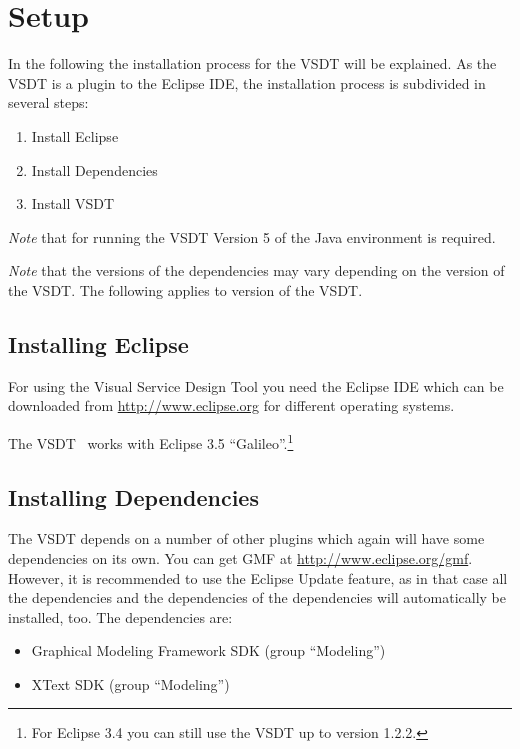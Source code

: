 \chapter{Setup}
\label{sec:user_setup}

In the following the installation process for the VSDT will be explained. As the VSDT is a plugin to the Eclipse IDE, the installation process is subdivided in several steps:
\begin{enumerate}
	\item Install Eclipse
	\item Install Dependencies
	\item Install VSDT
\end{enumerate}

\emph{Note} that for running the VSDT Version 5 of the Java environment is required.

\emph{Note} that the versions of the dependencies may vary depending on the version of the VSDT. The following applies to version \version of the VSDT.


\section{Installing Eclipse}
\label{sec:user_setup_eclipse}

For using the Visual Service Design Tool you need the Eclipse IDE which can be downloaded from \url{http://www.eclipse.org} for different operating systems.

The VSDT \version\ works with Eclipse 3.5 ``Galileo''.\footnote{For Eclipse 3.4 you can still use the VSDT up to version 1.2.2.}


\section{Installing Dependencies}
\label{sec:user_setup_dep}

The VSDT depends on a number of other plugins which again will have some dependencies on its own.  You can get GMF at \url{http://www.eclipse.org/gmf}. However, it is recommended to use the Eclipse Update feature, as in that case all the dependencies and the dependencies of the dependencies will automatically be installed, too.  The dependencies are:

\begin{itemize}
	\item Graphical Modeling Framework SDK (group ``Modeling'')
	\item XText SDK (group ``Modeling'')
\end{itemize}

